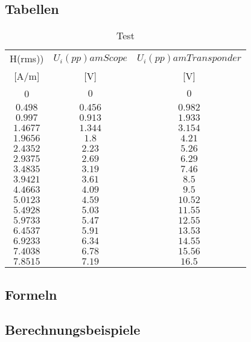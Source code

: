 \documentclass[12pt,a4paper,ngerman]{article}
\begin{document}
\subsection{Tabellen}
\begin{table}
\begin{center}
\begin{tabular}{ |c|c|c| }
  \hline

    H(rms)) & $U_i(pp) am Scope$ & $U_i(pp) am Transponder$\\

	[A/m] & [V] & [V] \\
  \hline
  0 & $0$ & $0$\\
  \hline
  $0.498$ & $0.456$ & $0.982$ \\
  \hline
  $0.997$ & $0.913$ & $1.933$\\
  \hline
  $1.4677$ & $1.344$ & $3.154$\\
    \hline
  $1.9656$ & $1.8$ & $4.21$\\
    \hline
  $2.4352$ & $2.23$ & $5.26$ \\
    \hline
  $2.9375$ & $2.69$ & $6.29$\\
     \hline
  $3.4835$ & $3.19$ & $7.46$ \\ 
    \hline
  $3.9421$ & $3.61$ & $8.5$  \\
    \hline
  $4.4663$ & $4.09$ & $9.5$  \\
    \hline
  $5.0123$ & $4.59$ & $10.52$  \\
    \hline
  $5.4928$ & $5.03$ & $11.55$  \\
    \hline
  $5.9733$ & $5.47$ & $12.55$ \\
     \hline
  $6.4537$ & $5.91$ & $13.53$ \\
      \hline
  $6.9233$ & $6.34$ & $14.55$ \\ 
      \hline
  $7.4038$ & $6.78$ & $15.56$  \\
      \hline
  $7.8515$ & $7.19$ & $16.5$  \\
      \hline 
\end{tabular}
\caption{Test}
\end{center}
\end{table} 
\subsection{Formeln}

\subsection{Berechnungsbeispiele}
\end{document}
